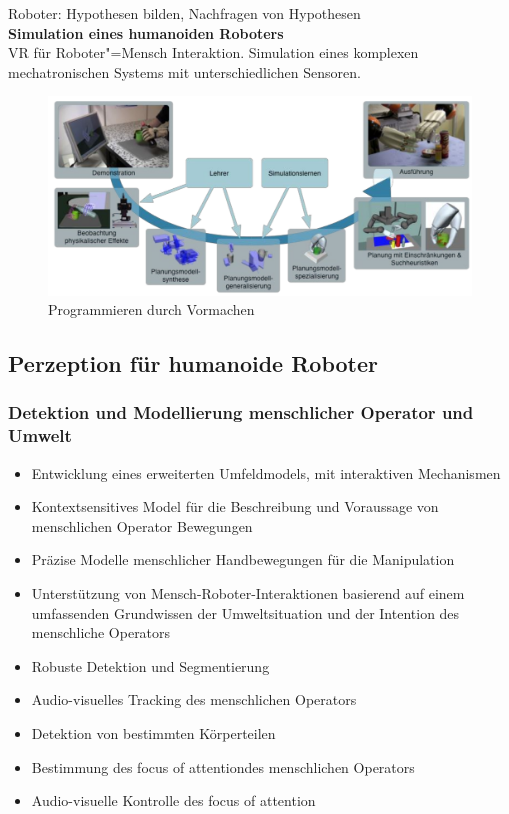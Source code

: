 Roboter: Hypothesen bilden, Nachfragen von Hypothesen\\
\textbf{Simulation eines humanoiden Roboters}\\
VR für Roboter"=Mensch Interaktion. Simulation eines komplexen mechatronischen Systems mit unterschiedlichen Sensoren.
\begin{figure}[h!]
	\centering
	\includegraphics[width=\textwidth]{figures/pdv.png}
	\caption{Programmieren durch Vormachen}
\end{figure}

\subsection{Perzeption für humanoide Roboter}

\subsubsection{Detektion und Modellierung menschlicher Operator und Umwelt}
\begin{itemize}
	\item Entwicklung eines erweiterten Umfeldmodels, mit interaktiven Mechanismen
	\item Kontextsensitives Model für die Beschreibung und Voraussage von menschlichen Operator Bewegungen
	\item Präzise Modelle menschlicher Handbewegungen für die Manipulation
	\item Unterstützung von Mensch-Roboter-Interaktionen basierend auf einem umfassenden Grundwissen der Umweltsituation und der Intention des menschliche Operators
	\item Robuste Detektion und Segmentierung
	\item Audio-visuelles Tracking des menschlichen Operators
	\item Detektion von bestimmten Körperteilen
	\item Bestimmung des \glqq focus of attention\grqq	 des menschlichen Operators
	\item Audio-visuelle Kontrolle des \glqq focus of attention\grqq
\end{itemize}

